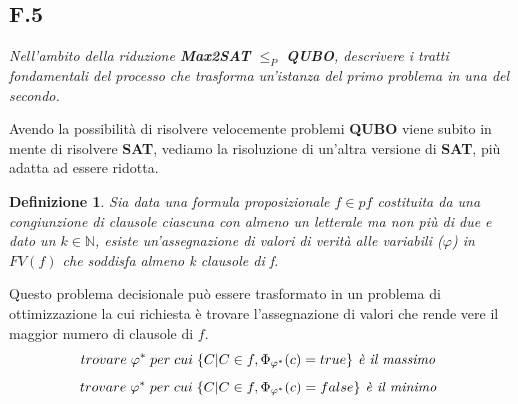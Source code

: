 \documentclass[a4paper]{article}
\newtheorem*{definition}{Definizione}
\begin{document}
\subsection{F.5}
\label{SEC:F5}
\emph{Nell’ambito della riduzione \textbf{Max2SAT} $\leq_P$ \textbf{QUBO}, descrivere i tratti fondamentali del processo che trasforma un’istanza del primo problema in una del secondo.}

Avendo la possibilità di risolvere velocemente problemi \textbf{QUBO} viene subito in mente di risolvere \textbf{SAT}, vediamo la risoluzione di un'altra versione di \textbf{SAT}, più adatta ad essere ridotta.
\begin{definition}
	Sia data una formula proposizionale $f \in pf$ costituita da una congiunzione di clausole ciascuna con almeno un letterale ma non più di due e dato un $k \in \mathbb{N}$, esiste un'assegnazione di valori di verità alle variabili ($\varphi $) in $FV(f)$ che soddisfa almeno k clausole di f.
\end{definition}
Questo problema decisionale può essere trasformato in un problema di ottimizzazione la cui richiesta è trovare l'assegnazione di valori che rende vere il maggior numero di clausole di $f$.
$$ trovare \; \varphi^* \; per \; cui \; \{C \vert C \in f,  \Phi _ {\varphi^*}(c) = true \} \text{\textit{ è il massimo }}$$
$$ trovare \; \varphi^* \; per \; cui \; \{C \vert C \in f,  \Phi _ {\varphi^*}(c) = false \} \text{\textit{ è il minimo }}$$
\end{document}
